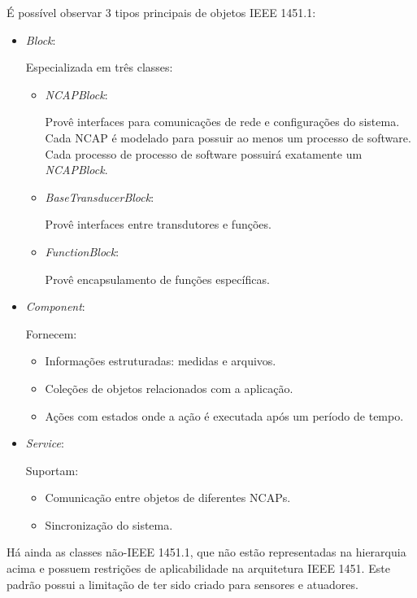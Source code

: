 É possível observar 3 tipos principais de objetos IEEE 1451.1:

\begin{itemize}
	\item\emph{Block}:

	Especializada em três classes:
		\begin{itemize}
			\item\emph{NCAPBlock}:

				Provê interfaces para comunicações de rede e configurações do sistema. Cada NCAP é modelado para possuir ao menos um processo de software. Cada processo de processo de software possuirá exatamente um \emph{NCAPBlock}.
			\item\emph{BaseTransducerBlock}:

				Provê interfaces entre transdutores e funções.
			\item\emph{FunctionBlock}:

				Provê encapsulamento de funções específicas.
		\end{itemize}
	
	\item\emph{Component}:
	
		Fornecem:
		\begin{itemize}
			\item Informações estruturadas: medidas e arquivos.
			\item Coleções de objetos relacionados com a aplicação.
			\item Ações com estados onde a ação é executada após um período de tempo.
		\end{itemize}
	\item\emph{Service}:
	
		Suportam:
		\begin{itemize}
			\item Comunicação entre objetos de diferentes NCAPs.
			\item Sincronização do sistema.
		\end{itemize}
\end{itemize}

Há ainda as classes não-IEEE 1451.1, que não estão representadas na hierarquia acima e possuem restrições de aplicabilidade na arquitetura IEEE 1451. Este padrão possui a limitação de ter sido criado para sensores e atuadores.


